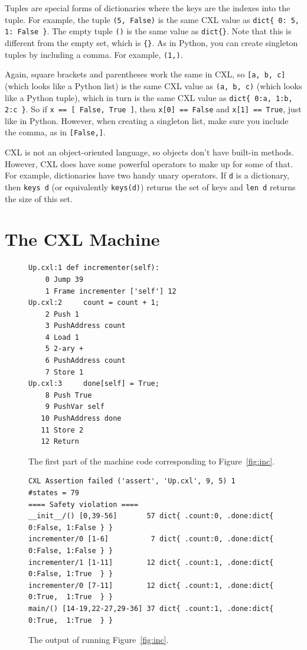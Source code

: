 \documentclass{report}
\newenvironment{code}{
\tcolorbox
}{
\endtcolorbox
}
\begin{document}
Tuples are special forms of dictionaries where the keys are
the indexes into the tuple.  For example, the tuple
\texttt{(5, False)} is the same CXL value as
\texttt{dict\{ 0: 5, 1: False \}}.
The empty tuple \texttt{()} is the same value as \texttt{dict\{\}}.
Note that this is different from the empty set, which is \texttt{\{\}}.
As in Python, you can create singleton tuples by including a comma.
For example, \texttt{(1,)}.

Again, square brackets and parentheses work the same in CXL, so
\texttt{[a, b, c]} (which looks like a Python list)
is the same CXL value as \texttt{(a, b, c)} (which looks like a Python tuple),
which in turn is the same CXL value as \texttt{dict\{ 0:a, 1:b, 2:c \}}.
So if \texttt{x == [ False, True ]},
then \texttt{x[0] == False} and \texttt{x[1] == True}, just like in Python.
However, when creating a singleton list, make sure you include the
comma, as in \texttt{[False,]}.

CXL is not an object-oriented language, so objects don't have
built-in methods.  However, CXL does have some powerful operators to
make up for some of that.
For example, dictionaries have two handy unary operators.
If \texttt{d} is a
dictionary, then \texttt{keys~d} (or equivalently \texttt{keys(d)})
returns the set of keys and \texttt{len~d} returns the size of
this set.

\chapter{The CXL Machine}
\label{ch:cxlmachine}

\begin{figure}
\begin{code}
\begin{verbatim}
Up.cxl:1 def incrementer(self):
    0 Jump 39
    1 Frame incrementer ['self'] 12
Up.cxl:2     count = count + 1;
    2 Push 1
    3 PushAddress count
    4 Load 1
    5 2-ary +
    6 PushAddress count
    7 Store 1
Up.cxl:3     done[self] = True;
    8 Push True
    9 PushVar self
   10 PushAddress done
   11 Store 2
   12 Return
\end{verbatim}
\end{code}
\caption{The first part of the machine code corresponding to Figure~\ref{fig:inc}.}
\label{fig:inccode}
\end{figure}

\begin{figure}
\begin{code}
\begin{verbatim}
CXL Assertion failed ('assert', 'Up.cxl', 9, 5) 1
#states = 79
==== Safety violation ====
__init__/() [0,39-56]       57 dict{ .count:0, .done:dict{ 0:False, 1:False } }
incrementer/0 [1-6]          7 dict{ .count:0, .done:dict{ 0:False, 1:False } }
incrementer/1 [1-11]        12 dict{ .count:1, .done:dict{ 0:False, 1:True  } }
incrementer/0 [7-11]        12 dict{ .count:1, .done:dict{ 0:True,  1:True  } }
main/() [14-19,22-27,29-36] 37 dict{ .count:1, .done:dict{ 0:True,  1:True  } }
\end{verbatim}
\end{code}
\caption{The output of running Figure~\ref{fig:inc}.}
\label{fig:incoutput}
\end{figure}
\end{document}
